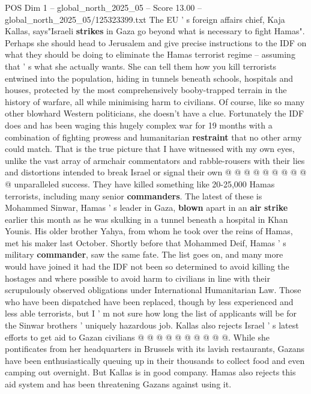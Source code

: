 \begin{textsample}{POS Dim 1 – global\_north\_2025\_05 – Score 13.00 – global\_north\_2025\_05/125323399.txt}  \label{ex:f1_pos_377}
The EU ' s foreign affairs chief, Kaja Kallas, says"Israeli \textbf{strikes} in Gaza go beyond what is necessary to fight Hamas".
Perhaps she should head to Jerusalem and give precise instructions to the IDF on what they should be doing to eliminate the Hamas terrorist regime -- assuming that ' s what she actually wants.
She can tell them how you kill terrorists entwined into the population, hiding in tunnels beneath schools, hospitals and houses, protected by the most comprehensively booby-trapped terrain in the history of warfare, all while minimising harm to civilians.
Of course, like so many other blowhard Western politicians, she doesn't have a clue.
Fortunately the IDF does and has been waging this hugely complex war for 19 months with a combination of fighting prowess and humanitarian \textbf{restraint} that no other army could match.
That is the true picture that I have witnessed with my own eyes, unlike the vast array of armchair commentators and rabble-rousers with their lies and distortions intended to break Israel or signal their own @ @ @ @ @ @ @ @ @ @ unparalleled success.
They have killed something like 20-25,000 Hamas terrorists, including many senior \textbf{commanders}.
The latest of these is Mohammed Sinwar, Hamas ' s leader in Gaza, \textbf{blown} apart in an \textbf{air} \textbf{strike} earlier this month as he was skulking in a tunnel beneath a hospital in Khan Younis.
His older brother Yahya, from whom he took over the reins of Hamas, met his maker last October.
Shortly before that Mohammed Deif, Hamas ' s military \textbf{commander}, saw the same fate.
The list goes on, and many more would have joined it had the IDF not been so determined to avoid killing the hostages and where possible to avoid harm to civilians in line with their scrupulously observed obligations under International Humanitarian Law.
Those who have been dispatched have been replaced, though by less experienced and less able terrorists, but I ' m not sure how long the list of applicants will be for the Sinwar brothers ' uniquely hazardous job.
Kallas also rejects Israel ' s latest efforts to get aid to Gazan civilians @ @ @ @ @ @ @ @ @ @.
While she pontificates from her headquarters in Brussels with its lavish restaurants, Gazans have been enthusiastically queuing up in their thousands to collect food and even camping out overnight.
But Kallas is in good company.
Hamas also rejects this aid system and has been threatening Gazans against using it.

\end{textsample}
